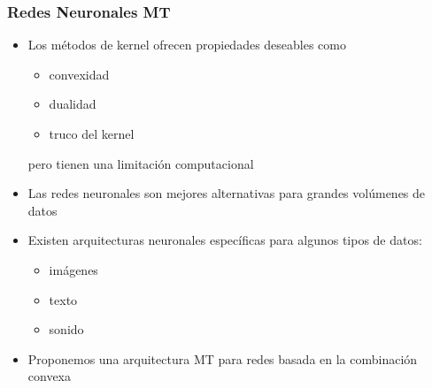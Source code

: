 \documentclass[aspectratio=43,spanish]{beamer}
\begin{document}
\begin{frame}
      \frametitle{Redes Neuronales MT}

      \begin{itemize}
            \item Los métodos de kernel ofrecen propiedades deseables como
            \begin{itemize}
                  \item convexidad
                  \item dualidad
                  \item truco del kernel
            \end{itemize}
            pero tienen una limitación computacional
            \item Las redes neuronales son mejores alternativas para grandes volúmenes de datos
            \item Existen arquitecturas neuronales específicas para algunos tipos de datos:
            \begin{itemize}
                  \item imágenes
                  \item texto
                  \item sonido
            \end{itemize}
            \item Proponemos una arquitectura MT para redes basada en la combinación convexa
      \end{itemize}

\end{frame}
\end{document}
